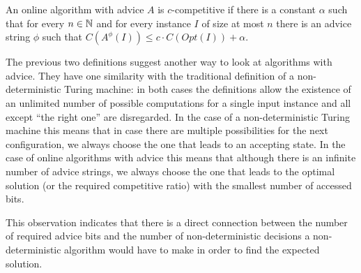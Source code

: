\begin{definition}\label{def:advice-competitive}
    An online algorithm with advice $A$ is $c$-competitive if there is a
    constant $\alpha$ such that for every $n \in \mathbb{N}$ and for every
    instance $I$ of size at most $n$ there is an advice string $\phi$ such
    that $C(A^\phi(I)) \leq c \cdot C(Opt(I)) + \alpha$.
\end{definition}


The previous two definitions suggest another way to look at algorithms
with advice. They have one similarity with the traditional definition of a
non-deterministic Turing machine: in both cases the definitions allow the
existence of an unlimited number of possible computations for a single
input instance and all except ``the right one'' are disregarded. In the
case of a non-deterministic Turing machine this means that in case there
are multiple possibilities for the next configuration, we always choose
the one that leads to an accepting state. In the case of online algorithms
with advice this means that although there is an infinite number of advice
strings, we always choose the one that leads to the optimal solution (or
the required competitive ratio) with the smallest number of accessed bits.

This observation indicates that there is a direct connection between the
number of required advice bits and the number of non-deterministic
decisions a non-deterministic algorithm would have to make in order to
find the expected solution.
